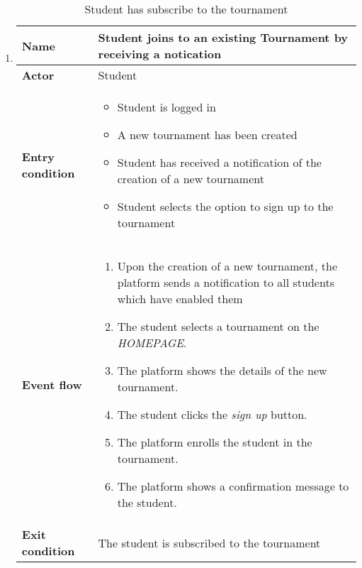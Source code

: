 \begin{enumerate}[label=\textbf{UC\arabic*}:,leftmargin=1.3cm]
      \item \textbf{}
            \begin{table}[H]
                  \centering
                  \begin{tabular}{|l|p{11.9cm}|}
                        \hline
                        \textbf{Name}            & Student joins to an existing Tournament by receiving a notication                     \\\hline
                        \textbf{Actor}           & Student                                                                               \\\hline
                        \textbf{Entry condition} &
                        \begin{itemize}
                              \item Student is logged in
                              \item A new tournament has been created
                              \item Student has received a notification of the creation of a new tournament
                              \item Student selects the option to sign up to the tournament
                        \end{itemize}                                                \\\hline
                        \textbf{Event flow}      &
                        \begin{enumerate}[label=\arabic*.]
                              \item Upon the creation of a new tournament, the platform sends a notification to all students which have enabled them
                              \item The student selects a tournament on the \emph{HOMEPAGE}.
                              \item The platform shows the details of the new tournament.
                              \item The student clicks the \emph{sign up} button.
                              \item The platform enrolls the student in the tournament.
                              \item The platform shows a confirmation message to the student.
                        \end{enumerate} \\\hline
                        \textbf{Exit condition}  & The student is subscribed to the tournament                                                         \\\hline
                  \end{tabular}
                  \caption{Student has subscribe to the tournament}
                  \label{table:Student has subscribe to the tournament}
            \end{table}


\end{enumerate}
